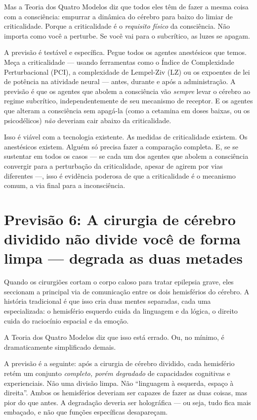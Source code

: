\documentclass[11pt, twoside, openright]{book}
\begin{document}
Mas a Teoria dos Quatro Modelos diz que todos eles têm de fazer a mesma coisa com a consciência: empurrar a dinâmica do cérebro para baixo do limiar de criticalidade. Porque a criticalidade é o \textit{requisito físico} da consciência. Não importa como você a perturbe. Se você vai para o subcrítico, as luzes se apagam.

A previsão é testável e específica. Pegue todos os agentes anestésicos que temos. Meça a criticalidade --- usando ferramentas como o Índice de Complexidade Perturbacional (PCI), a complexidade de Lempel-Ziv (LZ) ou os expoentes de lei de potência na atividade neural --- antes, durante e após a administração. A previsão é que os agentes que abolem a consciência vão \textit{sempre} levar o cérebro ao regime subcrítico, independentemente de seu mecanismo de receptor. E os agentes que alteram a consciência sem apagá-la (como a cetamina em doses baixas, ou os psicodélicos) \textit{não} deveriam cair abaixo da criticalidade.

Isso é viável com a tecnologia existente. As medidas de criticalidade existem. Os anestésicos existem. Alguém só precisa fazer a comparação completa. E, se se sustentar em todos os casos --- se cada um dos agentes que abolem a consciência convergir para a perturbação da criticalidade, apesar de agirem por vias diferentes ---, isso é evidência poderosa de que a criticalidade é o mecanismo comum, a via final para a inconsciência.

\section*{Previsão 6: A cirurgia de cérebro dividido não divide você de forma limpa --- degrada as duas metades}

Quando os cirurgiões cortam o corpo caloso para tratar epilepsia grave, eles seccionam a principal via de comunicação entre os dois hemisférios do cérebro. A história tradicional é que isso cria duas mentes separadas, cada uma especializada: o hemisfério esquerdo cuida da linguagem e da lógica, o direito cuida do raciocínio espacial e da emoção.

A Teoria dos Quatro Modelos diz que isso está errado. Ou, no mínimo, é dramaticamente simplificado demais.

A previsão é a seguinte: após a cirurgia de cérebro dividido, cada hemisfério retém um conjunto \textit{completo, porém degradado} de capacidades cognitivas e experienciais. Não uma divisão limpa. Não ``linguagem à esquerda, espaço à direita''. Ambos os hemisférios deveriam ser capazes de fazer as duas coisas, mas pior do que antes. A degradação deveria ser holográfica --- ou seja, tudo fica mais embaçado, e não que funções específicas desapareçam.
\end{document}
